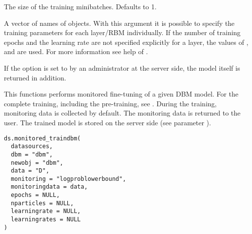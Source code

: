 \begin{Arguments}
\begin{ldescription}
\item[\code{batchsize}] The size of the training minibatches. Defaults to 1.

\item[\code{trainlayers}] A vector of names of  objects.
With this argument it is possible
to specify the training parameters for each layer/RBM individually.
If the number of training epochs and the learning rate are not specified
explicitly for a layer, the values of , 
and  are used.
For more information see help of .
\end{ldescription}
\end{Arguments}
%
\begin{Details}\relax
If the option  is set to 
by an administrator at the server side, the model itself is returned in addition.
\end{Details}
%
\begin{Description}\relax
This functions performs monitored fine-tuning of a given DBM model.
For the complete training, including the pre-training, see .
During the training, monitoring data is collected by default.
The monitoring data is returned to the user.
The trained model is stored on the server side (see parameter ).
\end{Description}
%
\begin{Usage}
\begin{verbatim}
ds.monitored_traindbm(
  datasources,
  dbm = "dbm",
  newobj = "dbm",
  data = "D",
  monitoring = "logproblowerbound",
  monitoringdata = data,
  epochs = NULL,
  nparticles = NULL,
  learningrate = NULL,
  learningrates = NULL
)
\end{verbatim}
\end{Usage}
%
